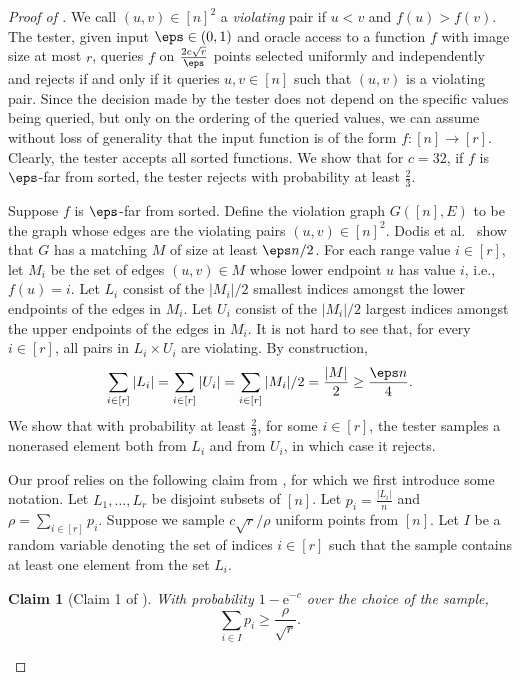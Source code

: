 \documentclass[11pt]{article}
\numberwithin{equation}{section}
\newtheorem{claim}[theorem]{Claim}
\theoremstyle{definition}
\theoremstyle{plain}
\newcommand{\eee}{\mathrm e}
\begin{document}
\begin{proof}[Proof of ] 
We call $(u, v) \in [n]^2$ a \emph{violating} pair if $u < v$ and $f(u) > f(v)$. The tester, given input $\eps \in (0,1)$ and oracle access to a function $f$ with image size at most $r$, queries $f$ on $\frac{2c\sqrt{r}}{\eps}$ points selected uniformly and independently and rejects if and only if it queries $u, v \in [n]$ such that $(u,v)$ is a violating pair.
Since the decision made by the tester does not depend on the specific values being queried, but only on the ordering of the queried values, we can assume without loss of generality that the input function is of the form $f:[n] \to [r]$. Clearly, the tester accepts all sorted functions. We show that for $c = 32$, if $f$ is $\eps$-far from sorted, the tester rejects with probability at least $\frac{2}{3}$. 

Suppose $f$ is $\eps$-far from sorted. Define the violation graph $G([n], E)$ to be the graph whose edges are the violating pairs $(u, v) \in [n]^2$. Dodis et al.~\cite[Lemma 7]{DGLRRS99} show that $G$ has a matching $M$  of size at least $\eps n /2$. For each range value $i \in [r]$, let $ M_i$ be the set of edges  $(u, v) \in M$ whose lower endpoint $u$ has value $i$, i.e., $f(u) = i$. Let $L_i$ consist of the $|M_i|/2$ smallest indices amongst the lower endpoints of the edges in $M_i$. Let $U_i$ consist of the $|M_i|/2$ largest indices amongst the upper endpoints of the  edges in $M_i$. It is not hard to see that, for every $i\in[r]$, all pairs in $L_i \times U_i$ are violating. By construction, 
\begin{equation}\label{eq:matching}
    \sum_{i \in [r]} |L_i| = \sum_{i \in [r]} |U_i| = \sum_{i \in [r]} |M_i|/2 = \frac{|M|}{2} \geq \frac{\eps n }{4}. 
\end{equation}
We show that with probability at least $\frac{2}{3}$, for some $i \in [r]$, the tester samples a nonerased element both from $L_i$ and from $U_i$, in which case it rejects. 


Our proof relies on the following claim from \cite{GGLRS00}, for which we first introduce some notation. Let $L_1,\dots, L_r$ be disjoint subsets of $[n]$. Let $p_i = \frac{|L_i|}{n}$ and $\rho = \sum_{i \in [r]} p_i$. Suppose we sample $c\sqrt{r}/ \rho$ uniform points from $[n]$. Let $I$ be a random variable denoting the set of indices $i \in [r]$ such that the sample contains at least one element from the set $L_i$. 

\begin{claim}[Claim 1 of \cite{GGLRS00}] \label{clm:gglrs}
With probability $1 - \eee^{-c}$ over the choice of the sample, 
\begin{equation*}
    \sum_{i \in I} p_i \geq \frac{\rho}{\sqrt{r}}.
\end{equation*}
\end{claim}




\end{proof}
\end{document}
